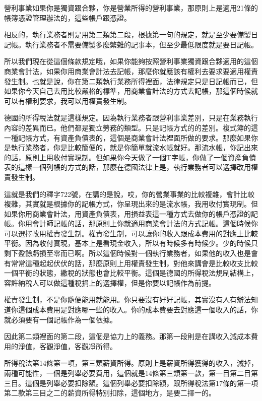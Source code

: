 \documentclass[oneside,sub3section]{ctexbook}
\begin{document}
營利事業如果你是獨資跟合夥，你是營業所得的營利事業，那原則上是適用21條的帳簿憑證管理辦法的，這些帳戶跟憑證。

相反的，執行業務者則是用第二類第二段，根據第一句的規定，就是至少要備製日記帳。執行業務者不需要備製多麼繁雜的記事本，但至少最低限度就是要日記帳。

所以我們現在從這個條款規定哦，如果你能夠按照營利事業獨資跟合夥適用的這個商業會計法，如果你用商業會計法去記帳，那麼你就應該有權利去要求要適用權責發生制。也就是說，你在第二類執行業務所得裡面，法律規定只是日記帳而已，但如果你今天自己去用比較嚴格的標準，用商業會計法的方式去記帳，那這個時候就可以有權利要求，我可以用權責發生制。

德國的所得稅法就是這樣規定。因為執行業務者跟營利事業差別，只是在業務執行內容的差異而已。他們都是獨立勞務的類型。只是記帳方式的的差別。複式簿的這一種記帳方式，有資產負債表的，這個是商業會計法裡面所做的要求。那麼如果你是執行業務者，你是比較簡便的，就是你簡單就流水帳就好。那流水帳，你記出來的話，原則上用收付實現制。但如果你今天做了一個T字帳，你做了一個資產負債表的這樣一個列帳的方式的話，那麼在德國法律上是，執行業務者可以選擇改用權責發生制。

這就是我們的釋字722號，在講的是說，哎，你的營業事業的比較複雜，會計比較複雜，其實就是根據你的記帳方式，你呈現出來的是流水帳，我用收付實現制。但如果你用商業會計法，用資產負債表，用損益表這一種方式去做你的帳戶憑證的記帳。你用會計師記帳的話，那原則上你就適用商業會計法的方式記帳。這個時候你可以選擇改用權責發生制。權責發生制，可以讓你的收入跟成本費用的對應上比較平衡。因為收付實現，基本上是看現金收入，所以有時候多有時候少。少的時候只剩下盈餘虧損至零而已啊。所以這個時候對一個執行業務者，如果他的收入也是會有常常這種起起伏伏的話，那麼原則上用權責發生制，對他來講會是比較收支比較一個平衡的狀態，繳稅的狀態也會比較平衡。這個是德國的所得稅法規制結構上，容許納稅人可以做這種稅捐上的選擇權，但是你要以記帳作為前提。

權責發生制，不是你隨便能用就能用。你只要沒有好好記帳，其實沒有人有辦法知道你這個成本費用是對應哪一些的收入。你的成本費要去對應這一個收入的話，你就必須要有一個記帳作為一個依據。

因此第二類裡面的第二段，這個是協力上的義務。那第一段則是在講收入減成本費用的淨值，客觀淨值，客觀凈所得。

所得稅法第14條第一項，第三類薪資所得。原則上是薪資所得獲得的收入，減掉，兩種可能性，一個是列舉必要費用，這個就是14條第三類第一款，第一目第二目第三目。這個是列舉必要扣除額。這個列舉必要扣除額，跟所得稅法第17條的第一項第二款第三目之二的薪資所得特別扣除，這個地方，是要二擇一的。
\end{document}
